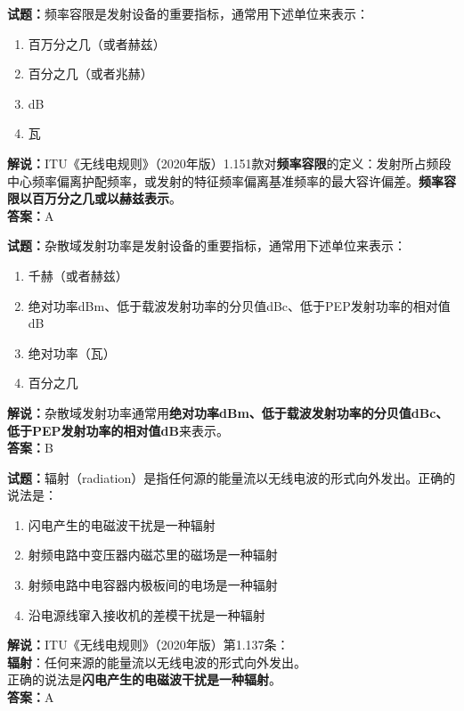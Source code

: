 \documentclass{ctexbook}
\begin{document}
\bigskip


\noindent\textbf{试题：}频率容限是发射设备的重要指标，通常用下述单位来表示：
\begin{enumerate}[leftmargin=3em]
	\item 百万分之几（或者赫兹）
	\item 百分之几（或者兆赫）
	\item dB
	\item 瓦
\end{enumerate}
\noindent\textbf{解说：}ITU《无线电规则》（2020年版）1.151款对\textbf{频率容限}的定义：发射所占频段中心频率偏离护配频率，或发射的特征频率偏离基准频率的最大容许偏差。\textbf{频率容限以百万分之几或以赫兹表示}。\\\noindent\textbf{答案：}A


\bigskip


\noindent\textbf{试题：}杂散域发射功率是发射设备的重要指标，通常用下述单位来表示：
\begin{enumerate}[leftmargin=3em]
	\item 千赫（或者赫兹）
	\item 绝对功率dBm、低于载波发射功率的分贝值dBc、低于PEP发射功率的相对值dB
	\item 绝对功率（瓦）
	\item 百分之几
\end{enumerate}
\noindent\textbf{解说：}杂散域发射功率通常用\textbf{绝对功率dBm、低于载波发射功率的分贝值dBc、低于PEP发射功率的相对值dB}来表示。\\\noindent\textbf{答案：}B


\bigskip


\noindent\textbf{试题：}辐射（radiation）是指任何源的能量流以无线电波的形式向外发出。正确的说法是：
\begin{enumerate}[leftmargin=3em]
\item 闪电产生的电磁波干扰是一种辐射
\item 射频电路中变压器内磁芯里的磁场是一种辐射
\item 射频电路中电容器内极板间的电场是一种辐射
\item 沿电源线窜入接收机的差模干扰是一种辐射
\end{enumerate}
\textbf{解说：}ITU《无线电规则》（2020年版）第1.137条：\\\textbf{辐射}：任何来源的能量流以无线电波的形式向外发出。\\正确的说法是\textbf{闪电产生的电磁波干扰是一种辐射}。\\\noindent\textbf{答案：}A
\end{document}
